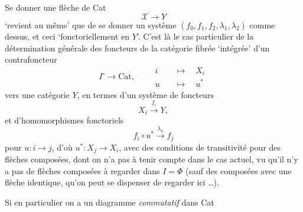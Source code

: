 \documentclass[11pt]{article}
\newcommand{\msp}[1]{\marginpar{\footnotesize [#1]}}
\newcommand{\Cat}{\mathrm{Cat}}
\newcommand{\cX}{\mathcal{X}}
\begin{document}
\msp{page 129}
Se donner une flèche de Cat
\[
\cX \longrightarrow Y
\]
`revient au même' que de se donner un système $(f_0, f_1, f_2, \lambda_1, \lambda_2)$ comme dessus, et ceci `fonctoriellement en $Y$'. C'est là le cas particulier de la détermination générale des foncteurs de la catégorie fibrée `intégrée' d'un contrafoncteur
\[
I^{\circ} \longrightarrow \Cat, \qquad
\begin{aligned}
i &\quad\longmapsto\quad X_i\\
u &\quad\longmapsto\quad u^*
\end{aligned}
\]
vers une catégorie $Y$, en termes d'un système de foncteurs
\[
X_i \xrightarrow{f_i} Y,
\]
et d'homomorphismes fonctoriels
\[
f_i\circ u^* \xrightarrow{\lambda_u} f_j
\]
pour $u : i \longrightarrow j$, d'où $u^* : X_j \longrightarrow X_i$, avec des conditions de transitivité pour des flèches composées, dont on n'a pas à tenir compte dans le cas actuel, vu qu'il n'y a pas de flèches composées à regarder dans $I = \Phi$ (sauf des composées avec une flèche identique, qu'on peut se dispenser de regarder ici \dots).

\msp{page 130}
Si en particulier on a un diagramme \textit{commutatif} dans Cat
\end{document}
